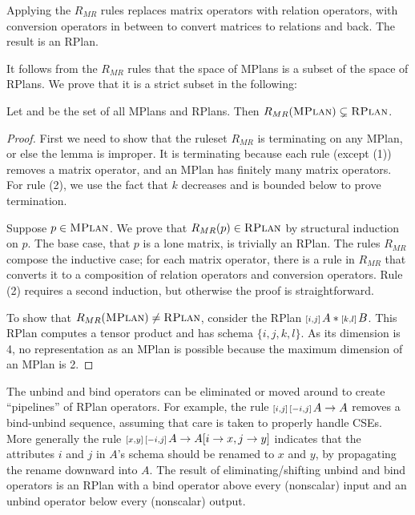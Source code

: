 Applying the $R_{MR}$ rules replaces matrix operators with relation operators, with conversion operators in between to convert matrices to relations and back. The result is an RPlan.

It follows from the $R_{MR}$ rules that the space of MPlans is a subset of the space of RPlans. We prove that it is a strict subset in the following:
\begin{lemma}
Let \MPLAN{} and \RPLAN{} be the set of all MPlans and RPlans.
Then $R_{MR}(\textsc{MPlan}{}) \subsetneq \textsc{RPlan}{}$.
\end{lemma}


\begin{proof}
First we need to show that the ruleset $R_{MR}$ is terminating on any MPlan, or else the lemma is improper. It is terminating because each rule (except (1)) removes a matrix operator, and an MPlan has finitely many matrix operators. For rule (2), we use the fact that $k$ decreases and is bounded below to prove termination.

Suppose $p \in \textsc{MPlan}{}$. 
We prove that $R_{MR}(p) \in \textsc{RPlan}{}$ by structural induction on $p$. 
The base case, that $p$ is a lone matrix, is trivially an RPlan.
The rules $R_{MR}$ compose the inductive case; for each matrix operator, there is a rule in $R_{MR}$ that converts it to a composition of relation operators and conversion operators.  Rule (2) requires a second induction, but otherwise the proof is straightforward. 

To show that $R_{MR}(\textsc{MPlan}{}) \neq \textsc{RPlan}{}$, consider the RPlan ${\scriptstyle\left[i,j\right]\,}A * {\scriptstyle\left[k,l\right]\,}B$.
This RPlan computes a tensor product and has schema $\{i,j,k,l\}$. As its dimension is 4, no representation as an MPlan is possible because the maximum dimension of an MPlan is 2.
\end{proof}


The unbind and bind operators can be eliminated or moved around to create ``pipelines'' of RPlan operators.
For example, the rule ${\scriptstyle\left[i,j\right]\,} {\scriptstyle\left[-i,j\right]\,} A \to A$ removes a bind-unbind sequence, assuming that care is taken to properly handle CSEs.
More generally the rule ${\scriptstyle\left[x,y\right]\,} {\scriptstyle\left[-i,j\right]\,} A \to A[i \to x, j \to y]$ indicates that the attributes $i$ and $j$ in $A$'s schema should be renamed to $x$ and $y$, by propagating the rename downward into $A$.
The result of eliminating/shifting unbind and bind operators is an RPlan with a bind operator above every (nonscalar) input and an unbind operator below every (nonscalar) output.



